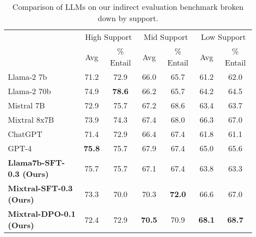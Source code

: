 \begin{table}[ht]
\centering
\begin{tabular}{l|c|c|c|c|c|c}
\toprule
& \multicolumn{2}{c|}{High Support} & \multicolumn{2}{c|}{Mid Support} & \multicolumn{2}{c}{Low Support} \\
\cmidrule{2-7}
& Avg & \% Entail & Avg & \% Entail & Avg & \% Entail \\
\midrule
Llama-2 7b & 71.2 & 72.9 & 66.0 & 65.7 & 61.2 & 62.0 \\
\midrule
Llama-2 70b & 74.9 & \textbf{78.6} & 66.2 & 65.7 & 64.2 & 64.5 \\
\midrule
Mistral 7B & 72.9 & 75.7 & 67.2 & 68.6 & 63.4 & 63.7 \\
\midrule
Mixtral 8x7B & 73.9 & 74.3 & 67.4 & 68.0 & 66.3 & 67.0 \\
\midrule
ChatGPT & 71.4 & 72.9 & 66.4 & 67.4 & 61.8 & 61.1 \\
\midrule
GPT-4 & \textbf{75.8} & 75.7 & 67.9 & 67.4 & 65.0 & 65.6 \\
\textbf{Llama7b-SFT-0.3 (Ours)} & 75.7 & 75.7 & 67.1 & 67.4 & 63.8 & 63.3 \\
\midrule
\midrule
\textbf{Mixtral-SFT-0.3 (Ours)} & 73.3 & 70.0 & 70.3 & \textbf{72.0} & 66.6 & 67.0 \\
\midrule

\textbf{Mixtral-DPO-0.1 (Ours)} & 72.4 & 72.9 & \textbf{70.5} & 70.9 & \textbf{68.1} & \textbf{68.7} \\

\bottomrule
\end{tabular}
\caption{\label{tab: grounded eval by support} Comparison of LLMs on our indirect evaluation benchmark broken down by support.
}
\end{table}

